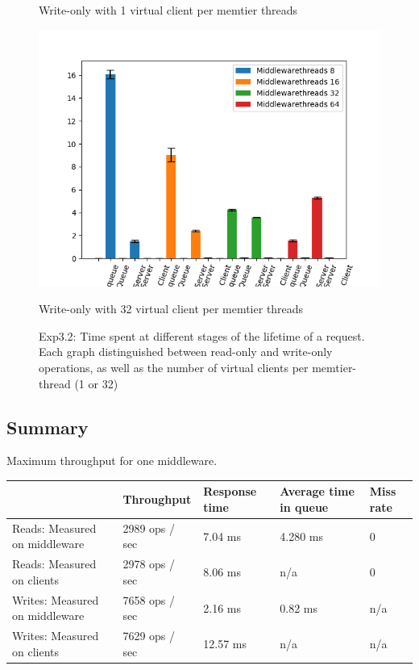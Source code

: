 \documentclass[11pt,a4paper]{article}
\begin{document}
\begin{figure}[H]
\begin{minipage}[b]{0.45\linewidth}
    \caption{Write-only with 1 virtual client per memtier threads} 
    \vspace{4ex}
  \end{minipage}%
  \begin{minipage}[b]{0.45\linewidth}
    \centering
    \includegraphics[width=0.7\linewidth]{img/exp3_2/exp3_2_mw_percentile_plots_writes_1__vc_32.png} 
    \caption{Write-only with 32 virtual client per memtier threads} 
    \vspace{4ex}
  \end{minipage} 
  \caption{Exp3.2: Time spent at different stages of the lifetime of a request. Each graph distinguished between read-only and write-only operations, as well as the number of virtual clients per memtier-thread (1 or 32)}
\end{figure}

\subsection{Summary}

\begin{center}
	{Maximum throughput for one middleware.}
	\begin{tabular}{|l|p{2cm}|p{2cm}|p{2cm}|p{2cm}|}
		\hline                                & Throughput & Response time & Average time in queue & Miss rate \\ 
		\hline Reads: Measured on middleware  & 2989 ops / sec & 7.04 ms & 4.280 ms &           0 \\ 
		\hline Reads: Measured on clients     & 2978 ops / sec & 8.06 ms & n/a                   &           0 \\ 
		\hline Writes: Measured on middleware & 7658 ops / sec & 2.16 ms & 0.82 ms & n/a       \\ 
		\hline Writes: Measured on clients    & 7629 ops / sec & 12.57 ms & n/a                   & n/a       \\ 
		\hline 
	\end{tabular}
\end{center}
\end{document}
